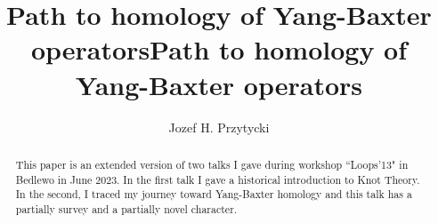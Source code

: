 \documentclass[12pt]{amsart}
\title{Path to homology of Yang-Baxter operators}
\author{Jozef H. Przytycki}
\begin{document}




\title{Path to homology of Yang-Baxter operators}


\address{Department of Mathematics, The George Washington University, Washington DC 20052, USA,  \\
and University of Gdansk, Poland,\\
ORCID: 0000-0002-1600-8889\quad\ E-mail: przytyck@gwu.edu}



\maketitle

\begin{abstract}

This paper is an extended version of two talks I gave during workshop ``Loops'13" in Bedlewo in June 2023. In the first talk I gave a historical introduction to Knot Theory. In the second, I traced my journey toward Yang-Baxter homology and this talk has a partially survey and a partially novel character.
\end{abstract}

\tableofcontents
\end{document}
